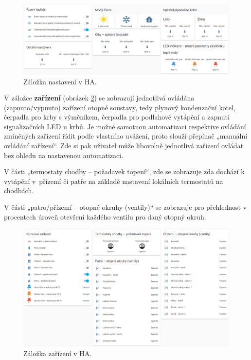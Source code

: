 \begin{figure}[H]
    \centering
    \includegraphics[width=\textwidth]{images/software-ha/zalozka-nastaveni.png}
    \caption{Záložka nastavení v HA.}
    \label{fig:zalozka-nastaveni}
\end{figure}

V záložce \textbf{zařízení} (obrázek \ref{fig:zalozka-zarizeni}) se zobrazují jednotlivá ovládána (zapnuto/vypnuto) zařízení otopné soustavy, tedy plynový kondenzační kotel, čerpadla pro krby s výměníkem, čerpadla pro podlahové vytápění a zapnutí signalizačních LED u krbů. Je možné samotnou automatizaci respektive ovládání zmíněných zařízení řídit podle vlastního uvážení, proto slouží přepínač „manuální ovládání zařízení“. Zde si pak uživatel může libovolně jednotlivá zařízení ovládat bez ohledu na nastavenou automatizaci.

V části „termostaty chodby – požadavek topení“, zde se zobrazuje zda dochází k vytápění v~přízemí či patře na základě nastavení lokálních termostatů na chodbách.

V části „patro/přízemí – otopné okruhy (ventily)“ se zobrazuje pro přehlednost v procentech úroveň otevření každého ventilu pro daný otopný okruh.

\begin{figure}[H]
    \centering
    \includegraphics[width=\textwidth]{images/software-ha/zalozka-zarizeni.png}
    \caption{Záložka zařízení v HA.}
    \label{fig:zalozka-zarizeni}
\end{figure}

